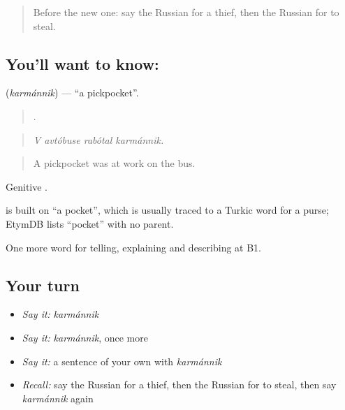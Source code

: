 \label{lesson:RU-C288-karmannik}



\begin{quote}
Before the new one: say the Russian for a thief, then the Russian for to steal.
\end{quote}

\subsection*{You'll want to know: }
\textbf{} (\emph{karmánnik}) — \textquotedblleft{}a pickpocket\textquotedblright{}.

\begin{quote}
   .
\end{quote}

\begin{quote}
\emph{V avtóbuse rabótal karmánnik.}
\end{quote}

\begin{quote}
A pickpocket was at work on the bus.
\end{quote}

Genitive \emph{}.

\begin{cousinweb}
\emph{} is built on \emph{} \textquotedblleft{}a pocket\textquotedblright{}, which is usually traced to a Turkic word for a purse; EtymDB lists \emph{} \textquotedblleft{}pocket\textquotedblright{} with no parent.
\end{cousinweb}

\begin{grammarlens}[title={What you've built}]
One more word for telling, explaining and describing at B1.
\end{grammarlens}

\subsection*{Your turn}
\begin{itemize}
\raggedright
  \item \emph{Say it:} \emph{karmánnik}
  \item \emph{Say it:} \emph{karmánnik}, once more
  \item \emph{Say it:} a sentence of your own with \emph{karmánnik}
  \item \emph{Recall:} say the Russian for a thief, then the Russian for to steal, then say \emph{karmánnik} again
\end{itemize}

